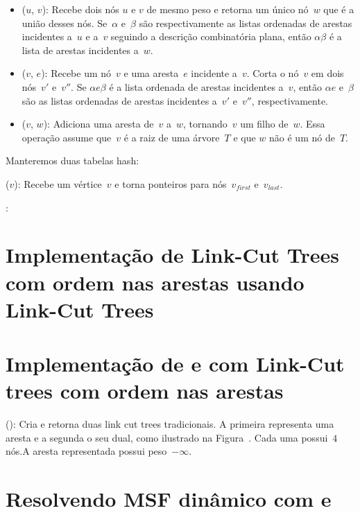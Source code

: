 \begin{itemize}
\item \LCOMerge($u$, $v$): Recebe dois nós $u$ e $v$ de mesmo peso e retorna um único nó~$w$ que é a união desses nós.
Se~$\alpha$ e~$\beta$ são respectivamente as listas ordenadas de arestas incidentes a~$u$ e a~$v$ seguindo a descrição combinatória plana, então $\alpha\beta$ é a lista de arestas incidentes a~$w$.
\item \LCOSplit($v$, $e$): Recebe um nó~$v$ e uma aresta~$e$ incidente a~$v$.
Corta o nó~$v$ em dois nós~$v'$ e~$v''$. Se $\alpha e\beta$ é a lista ordenada de arestas incidentes a~$v$, então $\alpha e$ e~$\beta$ são as listas ordenadas de arestas incidentes a~$v'$ e~$v''$, respectivamente.
\item \LCOLink($v$, $w$): Adiciona uma aresta de~$v$ a~$w$, tornando~$v$ um filho de~$w$. Essa operação assume que~$v$ é a raiz de uma árvore~$T$ e que $w$ não é um nó de~$T$.
\end{itemize}



Manteremos duas tabelas hash:

\hashNP($v$): Recebe um vértice~$v$ e torna ponteiros para nós~$v_{first}$ e~$v_{last}$.

\hashEdges:


\section{Implementação de Link-Cut Trees com ordem nas arestas usando Link-Cut Trees}





\section{Implementação de \LCOSplice{} e \LCOMakeEdge{} com Link-Cut trees com ordem nas arestas}
\LCOMakeEdge(): Cria e retorna duas link cut trees tradicionais. A primeira representa uma aresta e a segunda o seu dual, como ilustrado na Figura~. Cada uma possui~$4$ nós.A aresta representada possui peso~$-\infty$.

\section{Resolvendo MSF dinâmico com \LCOSplice{} e \LCOMakeEdge{}}





